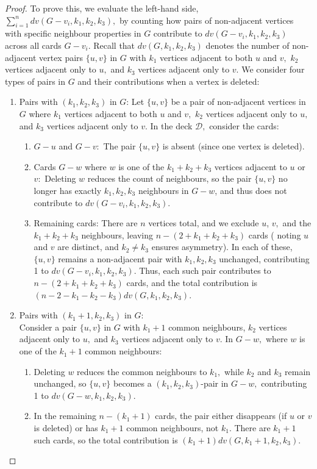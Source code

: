 \documentclass[11pt,oneside]{article}
\theoremstyle{definition}
\begin{document}
\begin{proof}
To prove this, we evaluate the left-hand side, $\sum_{i=1}^{n}{dv(G-v_i,k_1,k_2,k_3)},$ by counting how pairs of non-adjacent vertices with specific neighbour properties in $G$ contribute to $dv(G-v_i,k_1,k_2,k_3)$ across all cards $G-v_i.$ Recall that $dv(G,k_1,k_2,k_3)$ denotes the number of non-adjacent vertex pairs $\{u,v\}$ in $G$  with $k_1$ vertices adjacent to both $u$ and $v,$ $k_2$ vertices adjacent only to $u,$ and $k_3$ vertices adjacent only to $v.$ We consider four types of pairs in $G$ and their contributions when a vertex is deleted:
\begin{enumerate}
\item[(1)] Pairs with $(k_1,k_2,k_3)$ in $G$:
 Let $\{u,v\}$ be a pair of non-adjacent vertices in $G$ where $k_1$ vertices adjacent to both $u$ and $v,$ $k_2$ vertices adjacent only to $u,$ and $k_3$ vertices adjacent only to $v.$ In the deck $\mathscr{D},$ consider the cards:

\begin{enumerate}
\item[{\bf \LARGE .}] $G-u$ and $G-v:$ The pair  $\{u,v\}$ is absent (since one vertex is deleted).
\item[{\bf \LARGE .}] Cards $G-w$ where $w$ is one of the $k_1+k_2+k_3$  vertices adjacent to $u$ or $v:$ Deleting $w$ reduces the count of neighbours, so the pair $\{u,v\}$ no longer has exactly $k_1,k_2,k_3$ neighbours in $G-w$, and thus does not contribute to $dv(G-v_i,k_1,k_2,k_3)$. 
\item[{\bf \LARGE .}] Remaining cards: There are $n$ vertices total, and we exclude $u$, $v,$ and the $k_1+k_2+k_3$ neighbours, leaving $n-(2+k_1+k_2+k_3)$ cards ( noting $u$ and $v$ are distinct, and $k_2 \neq k_3$ ensures asymmetry). In each of these, $\{u,v\}$ remains a non-adjacent pair with $k_1,k_2,k_3$ unchanged, contributing 1 to $dv(G-v_i,k_1,k_2,k_3)$. Thus, each such pair contributes to $n-(2+k_1+k_2+k_3)$ cards, and the total contribution is $(n-2-k_1-k_2-k_3)dv(G,k_1,k_2,k_3).$
\end{enumerate}
\item[(2)] Pairs with $(k_1+1,k_2,k_3)$ in $G$:\\
Consider a pair $\{u,v\}$ in $G$ with $k_1+1$ common neighbours, $k_2$ vertices adjacent only to $u,$ and $k_3$ vertices adjacent only to $v.$ In $G-w,$ where $w$ is one of the $k_1+1$ common neighbours:
\begin{enumerate}
\item[{\bf \LARGE .}] Deleting $w$ reduces the common neighbours to $k_1,$ while $k_2$ and $k_3$ remain unchanged, so $\{u,v\}$ becomes a $(k_1,k_2,k_3)$-pair in $G-w,$ contributing 1 to $dv(G-w,k_1,k_2,k_3).$
\item[{\bf \LARGE .}] In the remaining $n-(k_1+1)$ cards, the pair either disappears (if $u$ or $v$ is deleted) or has $k_1+1$ common neighbours, not $k_1.$ There are $k_1+1$ such cards, so the total contribution is $(k_1+1)dv(G, k_1+1,k_2,k_3).$
\end{enumerate}


\end{enumerate}
\end{proof}
\end{document}
